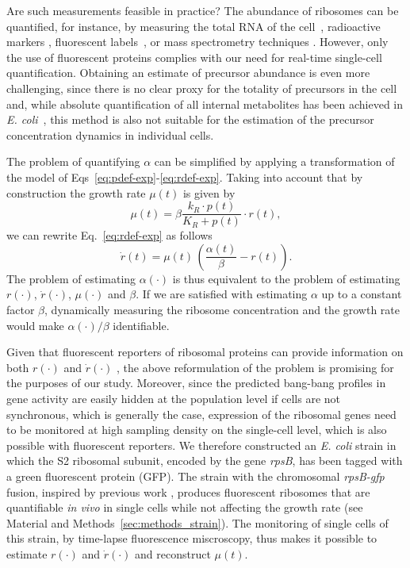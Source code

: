 Are such measurements feasible in practice?
The abundance of ribosomes can be quantified, for instance, by measuring the total RNA of the cell~\cite{scott_interdependence_2010}, radioactive markers \cite{gausing_regulation_1980,zengel_transcription_1986}, fluorescent labels~\cite{bakshi_superresolution_2012}, or mass spectrometry techniques \cite{HwaMSBProteomics}.
However, only the use of fluorescent proteins complies with our need for real-time single-cell quantification.
Obtaining an estimate of precursor abundance is even more challenging, since there is no clear proxy for the totality of precursors in the cell and, while absolute quantification of all internal metabolites has been achieved in \textit{E. coli}~\cite{bennett_absolute_2009}, this method is also not suitable for the estimation of the precursor concentration dynamics in individual cells.

The problem of quantifying $\alpha$ can be simplified by applying a transformation of the model of Eqs~\ref{eq:pdef-exp}-\ref{eq:rdef-exp}.
Taking into account that by construction the growth rate $\mu(t)$ is given by
\[
	\mu (t) = \beta \frac{k_R \cdot p(t)}{K_R + p(t)} \cdot r(t),
\]
we can rewrite Eq.~\ref{eq:rdef-exp} as follows
\begin{equation}
\label{eq:dot_r}
\dot{r}(t) = \mu (t) \, \left(\frac{\alpha(t)}{\beta} - r(t) \right).
\end{equation}
The problem of estimating $\alpha(\cdot)$ is thus equivalent to the problem of estimating $r(\cdot)$, $\dot{r}(\cdot)$, $\mu (\cdot)$ and $\beta$.
If we are satisfied with estimating $\alpha$ up to a constant factor $\beta$, dynamically measuring the ribosome concentration and the growth rate would make $\alpha (\cdot) / \beta$ identifiable. 

Given that fluorescent reporters of ribosomal proteins can provide information on both $r(\cdot)$ and $\dot{r}(\cdot)$ \cite{ValentinBioinformatics}, the above reformulation of the problem is promising for the purposes of our study.
Moreover, since the predicted bang-bang profiles in gene activity are easily hidden at the population level if cells are not synchronous, which is generally the case, expression of the ribosomal genes need to be monitored at high sampling density on the single-cell level, which is also possible with fluorescent reporters.
We therefore constructed an \textit{E. coli} strain in which the S2 ribosomal subunit, encoded by the gene \textit{rpsB}, has been tagged with a green fluorescent protein (GFP).
The strain with the chromosomal \textit{rpsB-gfp} fusion, inspired by previous work \cite{refBakshi}, produces fluorescent ribosomes that are quantifiable \textit{in vivo} in single cells while not affecting the growth rate (see Material and Methods~\ref{sec:methods_strain}).
The monitoring of single cells of this strain, by time-lapse fluorescence miscroscopy, thus makes it possible to estimate $r(\cdot)$ and $\dot{r}(\cdot)$ and reconstruct $\mu(t)$.

